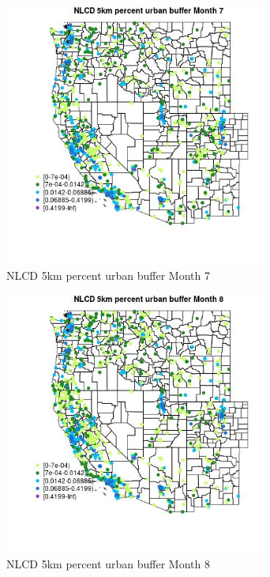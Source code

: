 \begin{figure} 
\centering  
\includegraphics[width=0.77\textwidth]{Code_Outputs/Report_ML_input_PM25_Step4_part_f_de_duplicated_aveswNAs_MapObsMo7NLCD_5km_percent_urban_buffer.jpg} 
\caption{\label{fig:Report_ML_input_PM25_Step4_part_f_de_duplicated_aveswNAsMapObsMo7NLCD_5km_percent_urban_buffer}NLCD 5km percent urban buffer Month 7} 
\end{figure} 
 

\begin{figure} 
\centering  
\includegraphics[width=0.77\textwidth]{Code_Outputs/Report_ML_input_PM25_Step4_part_f_de_duplicated_aveswNAs_MapObsMo8NLCD_5km_percent_urban_buffer.jpg} 
\caption{\label{fig:Report_ML_input_PM25_Step4_part_f_de_duplicated_aveswNAsMapObsMo8NLCD_5km_percent_urban_buffer}NLCD 5km percent urban buffer Month 8} 
\end{figure} 
 

